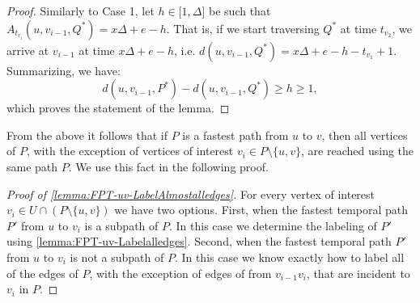 \documentclass[a4paper,UKenglish,cleveref, autoref, thm-restate, anonymous]{lipics-v2021}
\begin{document}
\begin{proof}
		Similarly to Case 1, let $h\in \lbrack 1,\Delta ]$ be such that $%
		A_{t_{v_{i}}}(u,v_{i-1},Q^{\ast })=x\Delta +e-h$. That is, if we start
		traversing $Q^{\ast }$ at time $t_{v_{2}}$, we arrive at $v_{i-1}$ at time $%
		x\Delta +e-h$, i.e. $d(u,v_{i-1},Q^{\ast })=x\Delta +e-h-t_{v_{1}}+1$.
		Summarizing, we have:%
		\begin{equation*}
			d(u,v_{i-1},P^{\ast })-d(u,v_{i-1},Q^{\ast })\geq h\geq 1,
		\end{equation*}%
		which proves the statement of the lemma.
	\end{proof}

 From the above it follows that if $P$ is a fastest path from $u$ to $v$,
 then all vertices of $P$, with the exception of vertices of interest $v_i \in P\setminus \{u,v\}$,
 are reached using the same path $P$.
 We use this fact in the following proof.

\begin{proof}[Proof of \cref{lemma:FPT-uv-LabelAlmostalledges}]
For every vertex of interest $v_i \in U \cap (P \setminus \{u,v\})$
we have two options.
First, when the fastest temporal path $P'$ from $u$ to $v_i$ is
a subpath of $P$.
In this case we determine the labeling of $P'$ using \cref{lemma:FPT-uv-Labelalledges}.
Second, when the fastest temporal path $P'$ from $u$ to $v_i$ is 
not a subpath of $P$. 
In this case we know exactly how to label all of the edges of $P$,
with the exception of edges of from $v_{i-1}v_i$, that are incident to $v_i$ in $P$.
\end{proof}
\end{document}
